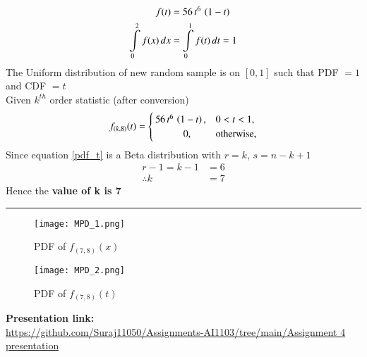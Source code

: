 \documentclass[journal,12pt,twocolumn]{IEEEtran}
\begin{document}
\begin{align}
f(t) &= 56\,t^{6}\,\left(1-t\right) \\
\int\limits_{0}^{2}f(x)\,dx &=  \int\limits_{0}^{1}f(t)\,dt = 1
\end{align}
The Uniform distribution of new random sample is on $[0,1]$ such that   PDF $= 1$ and CDF $= t$ \\
Given $k^{th}$ order statistic (after conversion)
\begin{align}
f_{(k,8)}(t) =
  \begin{cases}
      56\,t^{6}\,\left(1-t\right),  & 0<t<1, \\ 
      \hspace{1cm}   0,               & \text{otherwise,} 
  \end{cases}
  \label{pdf_t}
\end{align}
Since equation \eqref{pdf_t} is a Beta distribution with $r=k$, $s=n-k+1$  
\begin{align}
r-1 = k-1 &= 6 \\
\therefore k &= 7 
\end{align}
Hence the \textbf{value of k is 7}
\vspace{0.5cm}
\hrule
\newpage
\begin{figure}[htp]
    \centering
    \texttt{[image: MPD\_1.png]}
    \label{fig:maginal probability density 1}
    \caption{PDF of $f_{(7,8)}(x)$}
\centering
    \texttt{[image: MPD\_2.png]}
    \label{fig:maginal probability density 2}
    \caption{PDF of $f_{(7,8)}(t)$}
\end{figure}
\begin{center}
\textbf{Presentation link:} \\
\url{https://github.com/Suraj11050/Assignments-AI1103/tree/main/Assignment 4 presentation}
\end{center}
\end{document}

